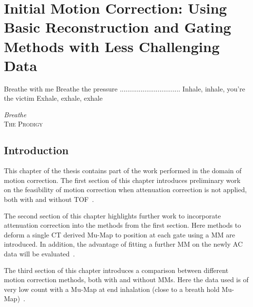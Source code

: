 \chapter{Initial Motion Correction: Using Basic Reconstruction and Gating Methods with Less Challenging Data} \label{sec:initial_motion_correction_using_basic_reconstruction_and_gating_methods_with_less_challenging_data}
    \vspace*{\fill}
    \setlength{\epigraphwidth}{0.4\linewidth}
    \renewcommand{\epigraphflush}{flushright}
    \renewcommand{\epigraphsize}{\footnotesize}
    \epigraph{Breathe with me\newline
              Breathe the pressure\newline
              ................................\newline
              Inhale, inhale, you're the victim\newline
              Exhale, exhale, exhale}%
              {\textit{Breathe}\\ \textsc{The Prodigy}}
    
    \newpage
    
    \section{Introduction} \label{sec:initial_motion_correction_using_basic_reconstruction_and_gating_methods_with_less_challenging_data_introduction}
        This chapter of the thesis contains part of the work performed in the domain of motion correction. The first section of this chapter introduces preliminary work on the feasibility of motion correction when attenuation correction is not applied, both with and without \gls{TOF}~\parencite{Whitehead2019ImpactPET}.
        
        The second section of this chapter highlights further work to incorporate attenuation correction into the methods from the first section. Here methods to deform a single \gls{CT} derived \gls{Mu-Map} to position at each gate using a \gls{MM} are introduced. In addition, the advantage of fitting a further \gls{MM} on the newly \gls{AC} data will be evaluated~\parencite{Whitehead2020PET/CTFields}.
        
        The third section of this chapter introduces a comparison between different motion correction methods, both with and without \glspl{MM}. Here the data used is of very low count with a \gls{Mu-Map} at end inhalation (close to a breath hold \gls{Mu-Map})~\parencite{Whitehead2021ComparisonMap}.
        
